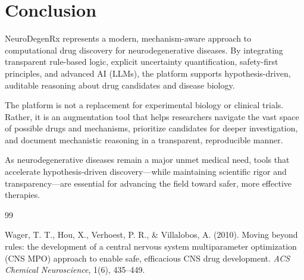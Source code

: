 \documentclass[12pt,a4paper]{article}
\begin{document}
\section{Conclusion}
\label{sec:conclusion}

NeuroDegenRx represents a modern, mechanism-aware approach to computational drug discovery for neurodegenerative diseases. By integrating transparent rule-based logic, explicit uncertainty quantification, safety-first principles, and advanced AI (LLMs), the platform supports hypothesis-driven, auditable reasoning about drug candidates and disease biology.

The platform is not a replacement for experimental biology or clinical trials. Rather, it is an augmentation tool that helps researchers navigate the vast space of possible drugs and mechanisms, prioritize candidates for deeper investigation, and document mechanistic reasoning in a transparent, reproducible manner.

As neurodegenerative diseases remain a major unmet medical need, tools that accelerate hypothesis-driven discovery---while maintaining scientific rigor and transparency---are essential for advancing the field toward safer, more effective therapies.

\begin{thebibliography}{99}

 Wager, T. T., Hou, X., Verhoest, P. R., \& Villalobos, A. (2010). Moving beyond rules: the development of a central nervous system multiparameter optimization (CNS MPO) approach to enable safe, efficacious CNS drug development. \textit{ACS Chemical Neuroscience}, 1(6), 435--449.

\end{thebibliography}
\end{document}
